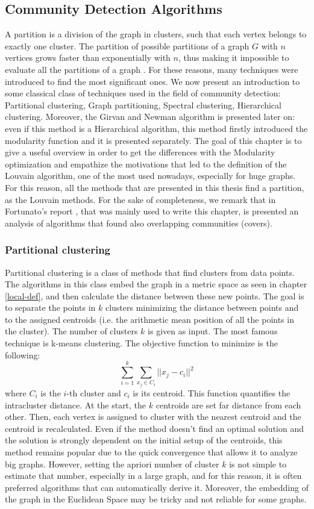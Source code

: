 \subsection{Community Detection Algorithms}
A partition is a division of the graph in clusters, such that each vertex belongs to exactly one cluster. 
The partition of possible partitions of a graph $G$ with $n$ vertices grows faster than exponentially with $n$,  thus making it impossible to evaluate all the partitions of a graph \cite{fortunato}. For these reasons, many techniques were introduced to find the most significant ones.
We now present an introduction to some classical class of techniques used in the field of community detection: Partitional clustering, Graph partitioning, Spectral clustering, Hierarchical clustering.  Moreover, the Girvan and Newman algorithm is presented later on: even if this method is a Hierarchical algorithm, this method firstly introduced the modularity function and it is presented separately. The goal of this chapter is to give a useful overview in order to get the differences with the Modularity optimization and empathize the motivations that led to the definition of the Louvain algorithm, one of the most used nowadays, especially for huge graphs. For this reason, all the methods that are presented in this thesis find a partition, as the Louvain methods. 
For the sake of completeness, we remark that in Fortunato's report \cite{fortunato}, that was mainly used to write this chapter, is presented an analysis of algorithms that found also overlapping communities (covers). 
\subsubsection{Partitional clustering}
Partitional clustering is a class of methods that find clusters from data points. The algorithms in this class embed the graph in a metric space as seen in chapter \ref{local-def}, and then calculate the distance between these new points.  The goal is to separate the points in $k$ clusters minimizing the distance between points and to the assigned centroids (i.e. the arithmetic mean position of all the points in the cluster). The number of clusters $k$ is given as input. The most famous technique is k-means clustering.
The objective function to minimize is the following:
\begin{equation}
\sum^k_{i=1} \sum_{x_j\in C_i} || x_j - c_i ||^2 
\end{equation}
where $C_i$ is the $i$-th cluster and $c_i$ is its centroid. This function quantifies the intracluster distance. 
At the start, the $k$ centroids are set far distance from each other. Then, each vertex is assigned to cluster with the nearest centroid and the centroid is recalculated.  Even if the method doesn't find an optimal solution and the solution is strongly dependent on the initial setup of the centroids, this method remains popular due to the quick convergence that allows it to analyze big graphs.
However, setting the apriori number of cluster $k$ is not simple to estimate that number,
especially in a large graph, and for this reason, it is often preferred algorithms that can automatically derive it. Moreover, the embedding of the graph in the Euclidean Space may be tricky and not reliable for some graphs.
